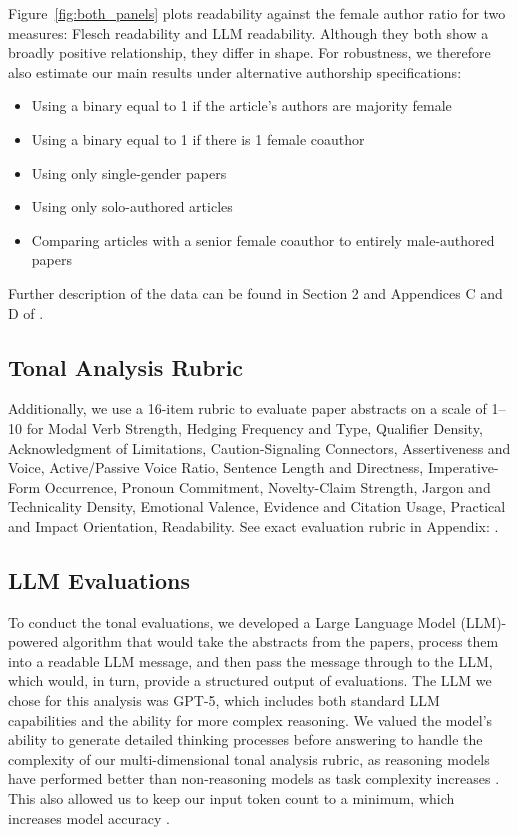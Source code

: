 Figure~\ref{fig:both_panels} plots readability against the female author ratio for two measures: Flesch readability \parencite{hengel2022publishing} and LLM readability. Although they both show a broadly positive relationship, they differ in shape. For robustness, we therefore also estimate our main results under alternative authorship specifications: 
\begin{itemize}
  \item Using a binary equal to 1 if the article's authors are majority female
  \item Using a binary equal to 1 if there is 1 female coauthor
  \item Using only single-gender papers
  \item Using only solo-authored articles
  \item Comparing articles with a senior female coauthor to entirely male-authored papers
\end{itemize}

Further description of the data can be found in Section 2 and Appendices C and D of \textcite{hengel2022publishing}.

\subsection{Tonal Analysis Rubric}\label{sec:Rubric}

Additionally, we use a 16-item rubric to evaluate paper abstracts on a scale of 1--10 for Modal Verb Strength, Hedging Frequency and Type, Qualifier Density, Acknowledgment of Limitations, Caution-Signaling Connectors, Assertiveness and Voice, Active/Passive Voice Ratio, Sentence Length and Directness, Imperative-Form Occurrence, Pronoun Commitment, Novelty-Claim Strength, Jargon and Technicality Density, Emotional Valence, Evidence and Citation Usage, Practical and Impact Orientation, Readability. See exact evaluation rubric in Appendix: .

\subsection{LLM Evaluations}\label{sec:LLM_Evaluations}

To conduct the tonal evaluations, we developed a Large Language Model (LLM)-powered algorithm that would take the abstracts from the papers, process them into a readable LLM message, and then pass the message through to the LLM, which would, in turn, provide a structured output of evaluations. The LLM we chose for this analysis was GPT-5, which includes both standard LLM capabilities and the ability for more complex reasoning. We valued the model’s ability to generate detailed thinking processes before answering to handle the complexity of our multi-dimensional tonal analysis rubric, as reasoning models have performed better than non-reasoning models as task complexity increases \parencite{shojaee2025illusionthinkingunderstandingstrengths}. This also allowed us to keep our input token count to a minimum, which increases model accuracy \parencite{modarressi2025nolimalongcontextevaluationliteral}. 

